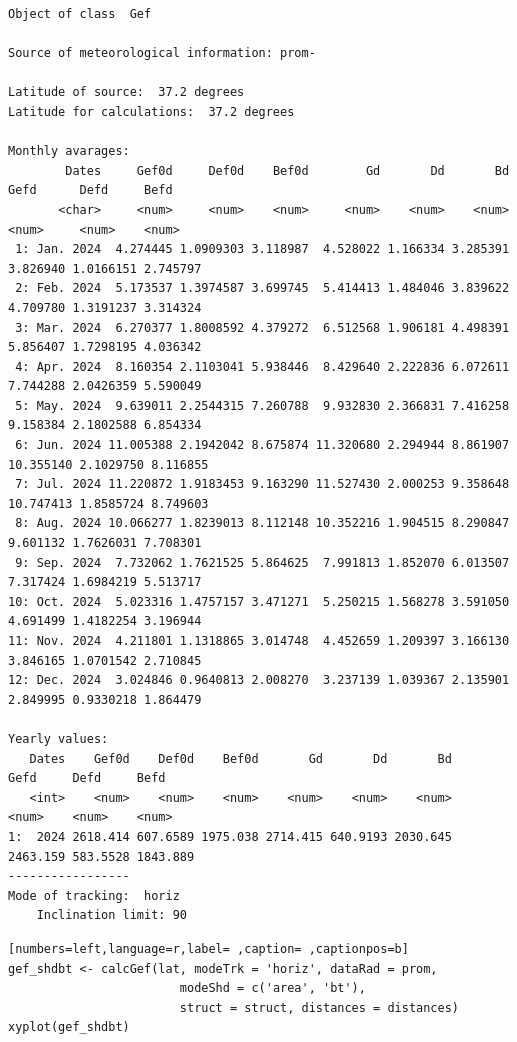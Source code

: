 \begin{verbatim}
Object of class  Gef 

Source of meteorological information: prom- 

Latitude of source:  37.2 degrees
Latitude for calculations:  37.2 degrees

Monthly avarages:
        Dates     Gef0d     Def0d    Bef0d        Gd       Dd       Bd      Gefd      Defd     Befd
       <char>     <num>     <num>    <num>     <num>    <num>    <num>     <num>     <num>    <num>
 1: Jan. 2024  4.274445 1.0909303 3.118987  4.528022 1.166334 3.285391  3.826940 1.0166151 2.745797
 2: Feb. 2024  5.173537 1.3974587 3.699745  5.414413 1.484046 3.839622  4.709780 1.3191237 3.314324
 3: Mar. 2024  6.270377 1.8008592 4.379272  6.512568 1.906181 4.498391  5.856407 1.7298195 4.036342
 4: Apr. 2024  8.160354 2.1103041 5.938446  8.429640 2.222836 6.072611  7.744288 2.0426359 5.590049
 5: May. 2024  9.639011 2.2544315 7.260788  9.932830 2.366831 7.416258  9.158384 2.1802588 6.854334
 6: Jun. 2024 11.005388 2.1942042 8.675874 11.320680 2.294944 8.861907 10.355140 2.1029750 8.116855
 7: Jul. 2024 11.220872 1.9183453 9.163290 11.527430 2.000253 9.358648 10.747413 1.8585724 8.749603
 8: Aug. 2024 10.066277 1.8239013 8.112148 10.352216 1.904515 8.290847  9.601132 1.7626031 7.708301
 9: Sep. 2024  7.732062 1.7621525 5.864625  7.991813 1.852070 6.013507  7.317424 1.6984219 5.513717
10: Oct. 2024  5.023316 1.4757157 3.471271  5.250215 1.568278 3.591050  4.691499 1.4182254 3.196944
11: Nov. 2024  4.211801 1.1318865 3.014748  4.452659 1.209397 3.166130  3.846165 1.0701542 2.710845
12: Dec. 2024  3.024846 0.9640813 2.008270  3.237139 1.039367 2.135901  2.849995 0.9330218 1.864479

Yearly values:
   Dates    Gef0d    Def0d    Bef0d       Gd       Dd       Bd     Gefd     Defd     Befd
   <int>    <num>    <num>    <num>    <num>    <num>    <num>    <num>    <num>    <num>
1:  2024 2618.414 607.6589 1975.038 2714.415 640.9193 2030.645 2463.159 583.5528 1843.889
-----------------
Mode of tracking:  horiz 
    Inclination limit: 90
\end{verbatim}

\begin{lstlisting}[numbers=left,language=r,label= ,caption= ,captionpos=b]
gef_shdbt <- calcGef(lat, modeTrk = 'horiz', dataRad = prom,
                        modeShd = c('area', 'bt'),
                        struct = struct, distances = distances)
xyplot(gef_shdbt)
\end{lstlisting}

